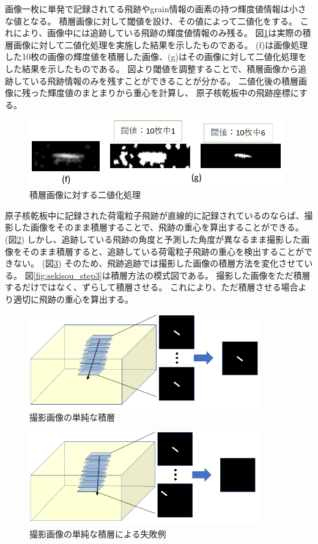 \documentclass[12pt,a4paper]{jarticle}
\begin{document}
画像一枚に単発で記録されてる飛跡やgrain情報の画素の持つ輝度値情報は小さな値となる。
積層画像に対して閾値を設け、その値によって二値化をする。
これにより、画像中には追跡している飛跡の輝度値情報のみ残る。
図\ref{fig:sekisou_nitika}は実際の積層画像に対して二値化処理を実施した結果を示したものである。
(f)は画像処理した10枚の画像の輝度値を積層した画像、(g)はその画像に対して二値化処理をした結果を示したものである。
図より閾値を調整することで、積層画像から追跡している飛跡情報のみを残すことができることが分かる。
二値化後の積層画像に残った輝度値のまとまりから重心を計算し、
原子核乾板中の飛跡座標にする。
\begin{figure}[htbp]
  \centering
     \includegraphics[width=110mm]{tuiseki_gazou2.png}
  \caption{積層画像に対する二値化処理\label{fig:sekisou_nitika}}
\end{figure}
\par
原子核乾板中に記録された荷電粒子飛跡が直線的に記録されているのならば、撮影した画像をそのまま積層することで、飛跡の重心を算出することができる。
(図\ref{fig:sekisou_step1})
しかし、追跡している飛跡の角度と予測した角度が異なるまま撮影した画像をそのまま積層すると、追跡している荷電粒子飛跡の重心を検出することができない。
(図\ref{fig:sekisou_step2})
そのため、飛跡追跡では撮影した画像の積層方法を変化させている。
図\ref{fig:sekisou_step3}は積層方法の模式図である。
撮影した画像をただ積層するだけではなく、ずらして積層させる。
これにより、ただ積層させる場合より適切に飛跡の重心を算出する。
\begin{figure}[htbp]
  \centering
     \includegraphics[width=100mm]{sekisou_step1.png}
  \caption{撮影画像の単純な積層\label{fig:sekisou_step1}}
\end{figure}
\begin{figure}[htbp]
  \centering
     \includegraphics[width=100mm]{sekisou_step2.png}
  \caption{撮影画像の単純な積層による失敗例\label{fig:sekisou_step2}}
\end{figure}
\end{document}
